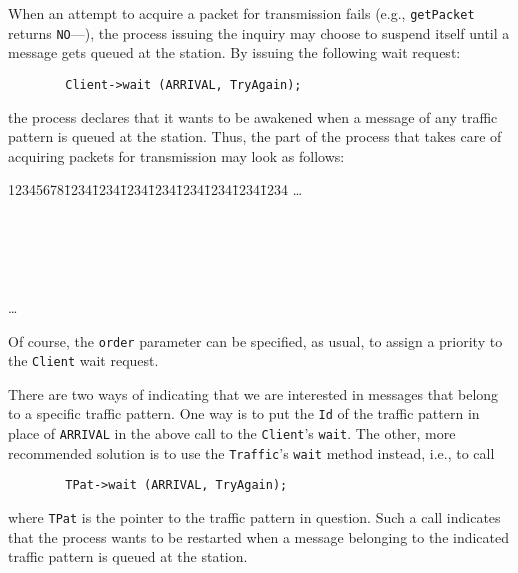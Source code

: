 When an attempt to acquire a packet for transmission fails (e.g.,
{\tt getPacket} returns {\tt NO}---), the process
issuing the inquiry may choose to suspend itself until a message gets queued
at the station.
By issuing the following wait request:
\begin{verbatim}
        Client->wait (ARRIVAL, TryAgain);
\end{verbatim}
the process declares that it wants to be awakened when a message of any
traffic pattern is queued at the station.
Thus, the part of the process that takes care of acquiring packets for
transmission may look as follows:
{\tt\begin{tabbing}
12345678\=1234\=1234\=1234\=1234\=1234\=1234\=1234\=1234\kill
\>\ldots \\
 \\
\> \\
\> \> \\
\> \> \\
\> \>{\tt \}} \\
\> \ldots \\
\end{tabbing}}
Of course, the {\tt order} parameter can be specified, as usual, to
assign a priority to the {\tt Client} wait request.

There are two ways of indicating that we are interested in messages that belong
to a specific traffic pattern.
One way is to put the {\tt Id} of the traffic pattern in place
of {\tt ARRIVAL} in the above call to the {\tt Client}'s {\tt wait}.
The other, more recommended solution is to use the {\tt Traffic}'s {\tt wait}
method instead, i.e., to call
\begin{verbatim}
        TPat->wait (ARRIVAL, TryAgain);
\end{verbatim}
where {\tt TPat} is the pointer to the traffic pattern in question.
Such a call indicates that the process wants to be restarted when a
message belonging to the indicated traffic pattern is queued at the station.

